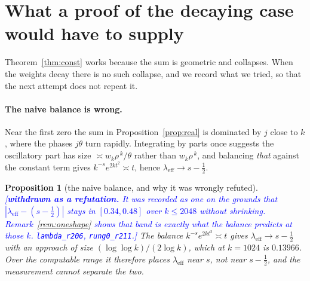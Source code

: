 \documentclass[11pt,a4paper]{article}
\theoremstyle{plain}
\newtheorem{proposition}[theorem]{Proposition}
\theoremstyle{definition}
\theoremstyle{remark}
\newcommand{\STATUS}[1]{\textcolor{blue}{\textsf{[#1]}}}
\begin{document}
\section{What a proof of the decaying case would have to supply}\label{sec:whatproof}

Theorem~\ref{thm:const} works because the sum is geometric and collapses. When the
weights decay there is no such collapse, and we record what we tried, so that the next
attempt does not repeat it.

\paragraph{The naive balance is wrong.}
Near the first zero the sum in Proposition~\ref{prop:real} is dominated by $j$ close to
$k$, where the phases $j\theta$ turn rapidly. Integrating by parts once suggests the
oscillatory part has size $\asymp w_k\rho^{\,k}/\theta$ rather than $w_k\rho^{\,k}$, and
balancing \emph{that} against the constant term gives
$k^{-s}e^{2kt^{2}}\asymp t$, hence $\lambda_{\mathrm{eff}}\to s-\tfrac12$.

\begin{proposition}[the naive balance, and why it was wrongly refuted]\label{prop:notshalf}
\STATUS{\textbf{withdrawn as a refutation.} It was recorded as one on the grounds that
$|\lambda_{\mathrm{eff}}-(s-\tfrac12)|$ stays in $[0.34,0.48]$ over $k\le2048$ without
shrinking. Remark~\ref{rem:oneshape} shows that band is exactly what the balance
\emph{predicts} at those $k$. \texttt{lambda\_r206}, \texttt{rung0\_r211}.}
The balance $k^{-s}e^{2kt^{2}}\asymp t$ gives $\lambda_{\mathrm{eff}}\to s-\tfrac12$ with
an approach of size $(\log\log k)/(2\log k)$, which at $k=1024$ is $0.13966$. Over the
computable range it therefore places $\lambda_{\mathrm{eff}}$ near $s$, not near
$s-\tfrac12$, and the measurement cannot separate the two.
\end{proposition}
\end{document}
